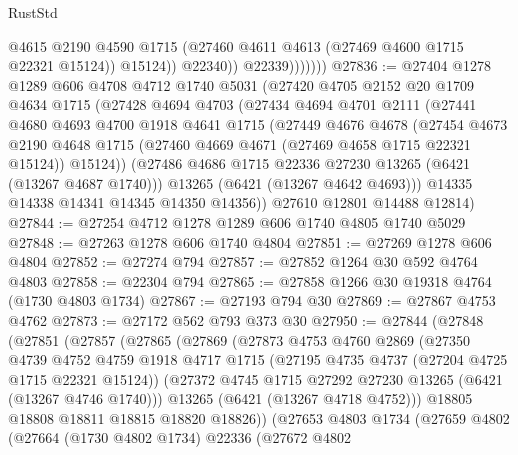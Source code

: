 \begin{lexlean}{RustStd}
\begin{coremodule}
                          @4615
                          @2190
                          @4590
                          @1715
                          (@27460 @4611 @4613 (@27469 @4600 @1715 @22321 @15124))
                          @15124))
                      @22340))
                  @22339)))))))
@27836 := @27404
    @1278
    @1289
    @606
    @4708
    @4712
    @1740
    @5031
    (@27420
      @4705
      @2152
      @20
      @1709
      @4634
      @1715
      (@27428
        @4694
        @4703
        (@27434
          @4694
          @4701
          @2111
          (@27441
            @4680
            @4693
            @4700
            @1918
            @4641
            @1715
            (@27449
              @4676
              @4678
              (@27454
                @4673
                @2190
                @4648
                @1715
                (@27460 @4669 @4671 (@27469 @4658 @1715 @22321 @15124))
                @15124))
            (@27486 @4686 @1715 @22336 @27230 @13265 (@6421 (@13267 @4687 @1740)))
            @13265
            (@6421 (@13267 @4642 @4693)))
          @14335
          @14338
          @14341
          @14345
          @14350
          @14356))
      @27610
      @12801
      @14488
      @12814)
@27844 := @27254 @4712 @1278 @1289 @606 @1740 @4805 @1740 @5029
@27848 := @27263 @1278 @606 @1740 @4804
@27851 := @27269 @1278 @606 @4804
@27852 := @27274 @794
@27857 := @27852 @1264 @30 @592 @4764 @4803
@27858 := @22304 @794
@27865 := @27858 @1266 @30 @19318 @4764 (@1730 @4803 @1734)
@27867 := @27193 @794 @30
@27869 := @27867 @4753 @4762
@27873 := @27172 @562 @793 @373 @30
@27950 := @27844
    (@27848
      (@27851
        (@27857
          (@27865
            (@27869
              (@27873
                @4753
                @4760
                @2869
                (@27350
                  @4739
                  @4752
                  @4759
                  @1918
                  @4717
                  @1715
                  (@27195 @4735 @4737 (@27204 @4725 @1715 @22321 @15124))
                  (@27372 @4745 @1715 @27292 @27230 @13265 (@6421 (@13267 @4746 @1740)))
                  @13265
                  (@6421 (@13267 @4718 @4752)))
                @18805
                @18808
                @18811
                @18815
                @18820
                @18826))
            (@27653
              @4803
              @1734
              (@27659
                @4802
                (@27664
                  (@1730 @4802 @1734)
                  @22336
                  (@27672
                    @4802

\end{coremodule}
\end{lexlean}
